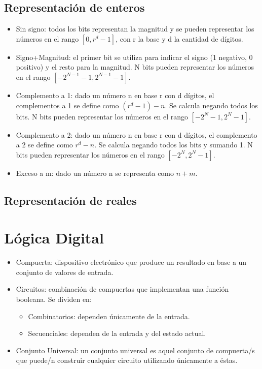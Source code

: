 \documentclass[a4paper,12pt]{article}
\begin{document}
\subsection{Representación de enteros}
\begin{itemize}
  \item Sin signo: todos los bits representan la magnitud y se pueden representar los números en el rango $[0, r^d-1]$, con
  r la base y d la cantidad de dígitos.
  \item Signo+Magnitud: el primer bit se utiliza para indicar el signo (1 negativo, 0 positivo) y el resto para la magnitud.
  N bits pueden representar los números en el rango $[-2^{N-1}-1, 2^{N-1}-1]$.
  \item Complemento a 1: dado un número n en base r con d dígitos, el complementos a 1 se define como $(r^d -1)-n$. Se calcula
  negando todos los bits. N bits pueden representar los números en el rango $[-2^N-1, 2^N-1]$.
  \item Complemento a 2: dado un número n en base r con d dígitos, el complemento a 2 se define como $r^d-n$. Se calcula
  negando todos los bits y sumando 1. N bits pueden representar los números en el rango $[-2^N, 2^N-1]$.
  \item Exceso a m: dado un número n se representa como $n+m$.
\end{itemize}

\subsection{Representación de reales}





\section{Lógica Digital}
\begin{itemize}
\item Compuerta: dispositivo electrónico que produce un resultado en base a un conjunto de valores de entrada.
\item Circuitos: combinación de compuertas que implementan una función booleana. Se dividen en:
\begin{itemize}
  \item Combinatorios: dependen únicamente de la entrada.
  \item Secuenciales: dependen de la entrada y del estado actual.
\end{itemize}
\item Conjunto Universal: un conjunto universal es aquel conjunto de compuerta/s que puede/n construir cualquier circuito
utilizando únicamente a éstas.
\end{itemize}
\end{document}
